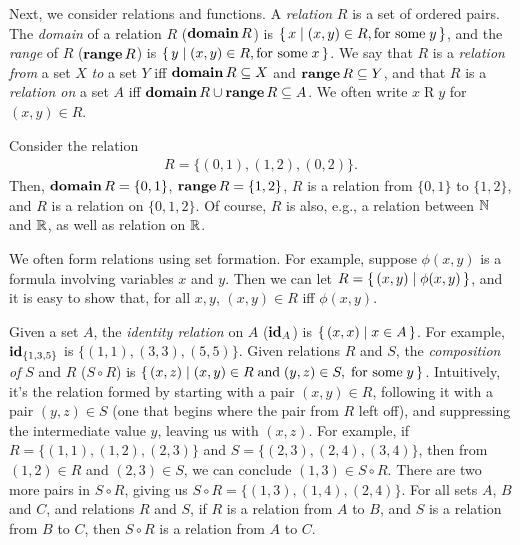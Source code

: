 Next, we consider relations and functions.  A \emph{relation}
%
$R$ is a set of ordered pairs.  The \emph{domain}
%
%
of a relation $R$ ($\mathbf{domain}\,R$)
%
%
is $\{ \, x \mid (x,y)\in R, \allowbreak\mbox{for
some}\allowbreak\;y \, \}$, and the \emph{range}
%
%
of $R$ ($\mathbf{range}\,R$)
%
%
is $\{ \, y \mid (x,y)\in R,
\allowbreak\mbox{for some}\allowbreak\;x \, \}$.  We say that $R$ is a \emph{relation from} a
%
set $X$ \emph{to} a set $Y$ iff $\mathbf{domain}\,R\subseteq X$ and $\mathbf{range}\,R\subseteq Y$,
and that $R$ is a \emph{relation on} a set $A$ iff
$\mathbf{domain}\,R\cup\mathbf{range}\,R\subseteq A$.  We often write $x\mathrel{R}y$ for
$(x, y)\in R$.

Consider the relation
\begin{gather*}
R=\{(0,1),(1,2),(0,2)\} .
\end{gather*}
Then, $\mathbf{domain}\,R=\{0,1\}$, $\mathbf{range}\,R=\{1,2\}$, $R$ is a relation from
$\{0,1\}$ to $\{1,2\}$, and $R$ is a relation on $\{0,1,2\}$.
Of course, $R$ is also, e.g., a relation between $\mathbb{N}$ and $\mathbb{R}$,
as well as relation on $\mathbb{R}$.

We often form relations using set formation.
%
%
%
%
For example, suppose
$\phi(x,y)$ is a formula involving variables $x$ and $y$.  Then we can
let $R=\{ \, (x,y) \mid \phi(x,y) \, \}$, and it is easy to show that, for all
$x, y$, $(x,y)\in R$ iff $\phi(x,y)$.

Given a set $A$, the \emph{identity relation}
%
%
on $A$ ($\mathbf{id}_A$)
%
%
is $\{ \, (x,x) \mid x\in A \, \}$.  For example, $\mathbf{id}_{\{1,3,5\}}$ is
$\{(1,1),(3,3),(5,5)\}$.
Given relations $R$ and $S$, the
\emph{composition of}
%
%
%
$S$ and $R$ ($S\circ R$)
%
%
is $\{ \, (x,z) \mid (x,y)\in R\;\allowbreak\mbox{and}\allowbreak\; (y,z)\in S,\;\allowbreak\mbox{for some}\allowbreak\; y \, \}$.
Intuitively, it's the relation formed by starting with a pair
$(x,y)\in R$, following it with a pair $(y,z)\in S$ (one that begins
where the pair from $R$ left off), and suppressing the intermediate
value $y$, leaving us with $(x,z)$.  For example, if $R=\{(1, 1), (1,
2), (2, 3)\}$ and $S=\{(2, 3), (2, 4), (3, 4)\}$, then from
$(1,2)\in R$ and $(2,3)\in S$, we can conclude $(1,3)\in S\circ R$.
There are two more pairs in $S\circ R$, giving us
$S\circ R=\{(1, 3), (1, 4), (2, 4)\}$.  For all sets $A$, $B$ and $C$,
and relations $R$ and $S$, if $R$ is a relation from $A$ to $B$,
and $S$ is a relation from $B$ to $C$, then $S\circ R$ is a relation
from $A$ to $C$.

